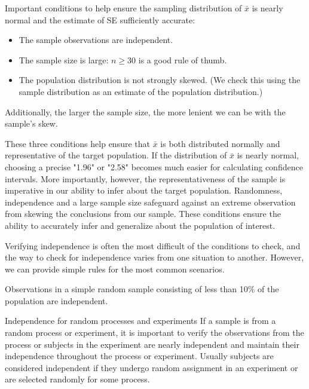 \begin{termBox}{
Important conditions to help ensure the sampling distribution of $\bar{x}$ is nearly normal and the estimate of SE sufficiently accurate:
\begin{itemize}
\setlength{\itemsep}{0mm}
\item The sample observations are independent.
\item The sample size is large: $n\geq30$ is a good rule of thumb.
\item The population distribution is not strongly skewed. (We check this using the sample distribution as an estimate of the population distribution.)
\end{itemize}
Additionally, the larger the sample size, the more lenient we can be with the sample's skew.}
\end{termBox}

These three conditions help ensure that $\bar{x}$ is both distributed normally and representative of the target population. If the distribution of $\bar{x}$ is nearly normal, choosing a precise "1.96" or "2.58" becomes much easier for calculating confidence intervals. More importantly, however, the representativeness of the sample is imperative in our ability to infer about the target population. Randomness, independence and a large sample size safeguard against an extreme observation from skewing the conclusions from our sample. These conditions ensure the ability to accurately infer and generalize about the population of interest.

Verifying independence is often the most difficult of the conditions to check, and the way to check for independence varies from one situation to another. However, we can provide simple rules for the most common scenarios. 

\begin{tipBox}{
Observations in a simple random sample consisting of less than 10\% of the population are independent.}
\end{tipBox}

\begin{caution}
{Independence for random processes and experiments}
{If a sample is from a random process or experiment, it is important to verify the observations from the process or subjects in the experiment are nearly independent and maintain their independence throughout the process or experiment. Usually subjects are considered independent if they undergo random assignment in an experiment or are selected randomly for some process.}
\end{caution}

